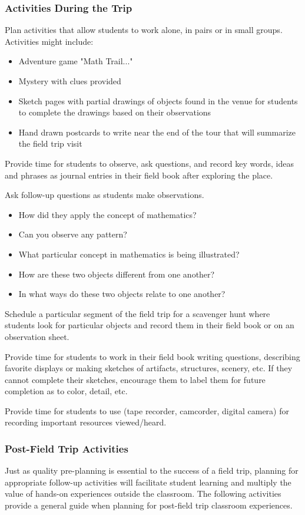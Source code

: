 \subsubsection*{Activities During the Trip}
Plan activities that allow students to work alone, in pairs or in small groups. Activities might include:
\begin{itemize}
\item Adventure game "Math Trail..."
\item Mystery with clues provided
\item Sketch pages with partial drawings of objects found in the venue for students to complete the
   drawings based on their observations
\item Hand drawn postcards to write near the end of the tour that will summarize the field trip visit
\end{itemize}
Provide time for students to observe, ask questions, and record key words, ideas and phrases as journal
entries in their field book after exploring the place.

Ask follow-up questions as students make observations.
\begin{itemize}
\item How did they apply the concept of mathematics?
\item Can you observe any pattern?
\item What particular concept in mathematics is being illustrated?
\item How are these two objects different from one another?
\item In what ways do these two objects relate to one another?
\end{itemize}
Schedule a particular segment of the field trip for a scavenger hunt where students look for particular
objects and record them in their field book or on an observation sheet.

Provide time for students to work in their field book writing questions, describing favorite displays or
making sketches of artifacts, structures, scenery, etc. If they cannot complete their sketches, encourage
them to label them for future completion as to color, detail, etc.

Provide time for students to use (tape recorder, camcorder, digital camera) for recording important
resources viewed/heard.
\subsubsection*{Post-Field Trip Activities}
Just as quality pre-planning is essential to the success of a field trip, planning for appropriate follow-up
activities will facilitate student learning and multiply the value of hands-on experiences outside the
classroom. The following activities provide a general guide when planning for post-field trip classroom
experiences.

